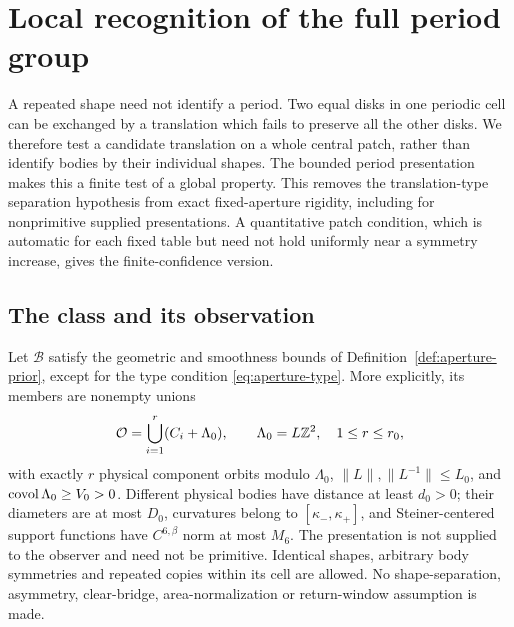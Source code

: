 \section{Local recognition of the full period group}
\label{sec:repeat}
A repeated shape need not identify a period. Two equal disks in one
periodic cell can be exchanged by a translation which fails to preserve
all the other disks. We therefore test a candidate translation on a
whole central patch, rather than identify bodies by their individual
shapes. The bounded period presentation makes this a finite test of a
global property. This removes the translation-type separation hypothesis
from exact fixed-aperture rigidity, including for nonprimitive supplied
presentations. A quantitative patch condition, which is automatic for
each fixed table but need not hold uniformly near a symmetry increase,
gives the finite-confidence version.

\subsection{The class and its observation}
\begin{definition}\label{def:repeatclass}
Let $\mathcal B$ satisfy the geometric and smoothness bounds of
Definition~\ref{def:aperture-prior}, except for the type condition
\eqref{eq:aperture-type}. More explicitly, its members are nonempty unions
\[
 \mathcal O=\bigcup_{i=1}^{r}(C_i+\Lambda_0),\qquad
 \Lambda_0=L\mathbb Z^2,\quad 1\le r\le r_0,
\]
with exactly $r$ physical component orbits modulo $\Lambda_0$,
$\|L\|,\|L^{-1}\|\le L_0$, and $\operatorname{covol}\Lambda_0\ge V_0>0$.
Different physical bodies have distance at least $d_0>0$; their diameters
are at most $D_0$, curvatures belong to $[\kappa_-,\kappa_+]$, and
Steiner-centered support functions have $C^{6,\beta}$ norm at most $M_6$.
The presentation is not supplied to the observer and need not be
primitive. Identical shapes, arbitrary body symmetries and repeated
copies within its cell are allowed. No shape-separation, asymmetry,
clear-bridge, area-normalization or return-window assumption is made.
\end{definition}

